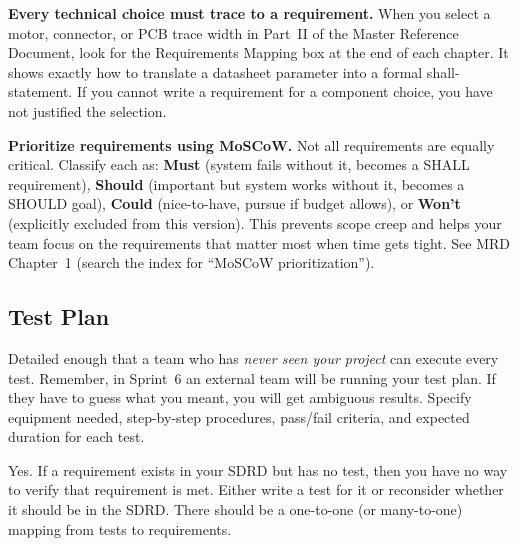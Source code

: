 \begin{protip}
\textbf{Every technical choice must trace to a requirement.} When you select a motor, connector, or PCB trace width in Part~II of the Master Reference Document, look for the Requirements Mapping box at the end of each chapter. It shows exactly how to translate a datasheet parameter into a formal shall-statement. If you cannot write a requirement for a component choice, you have not justified the selection.
\end{protip}

\begin{protip}
\textbf{Prioritize requirements using MoSCoW.} Not all requirements are equally critical. Classify each as: \textbf{Must} (system fails without it, becomes a SHALL requirement), \textbf{Should} (important but system works without it, becomes a SHOULD goal), \textbf{Could} (nice-to-have, pursue if budget allows), or \textbf{Won't} (explicitly excluded from this version). This prevents scope creep and helps your team focus on the requirements that matter most when time gets tight. See MRD Chapter~1 (search the index for ``MoSCoW prioritization'').
\end{protip}

\subsection{Test Plan}

\begin{faqbox}
Detailed enough that a team who has \textit{never seen your project} can execute every test. Remember, in Sprint~6 an external team will be running your test plan. If they have to guess what you meant, you will get ambiguous results. Specify equipment needed, step-by-step procedures, pass/fail criteria, and expected duration for each test.
\end{faqbox}

\begin{faqbox}
Yes. If a requirement exists in your SDRD but has no test, then you have no way to verify that requirement is met. Either write a test for it or reconsider whether it should be in the SDRD. There should be a one-to-one (or many-to-one) mapping from tests to requirements.
\end{faqbox}

